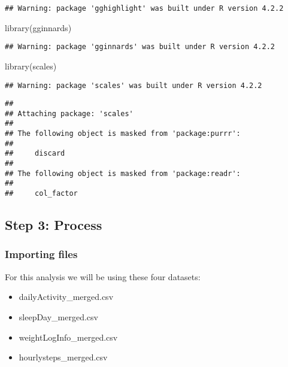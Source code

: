 \documentclass[
]{article}
\newenvironment{Shaded}{\begin{snugshade}}{\end{snugshade}}
\newcommand{\FunctionTok}[1]{\textcolor[rgb]{0.00,0.00,0.00}{#1}}
\newcommand{\NormalTok}[1]{#1}
\providecommand{\tightlist}{%
  \setlength{\itemsep}{0pt}\setlength{\parskip}{0pt}}
\begin{document}
\begin{verbatim}
## Warning: package 'gghighlight' was built under R version 4.2.2
\end{verbatim}

\begin{Shaded}
\begin{Highlighting}[]
  \FunctionTok{library}\NormalTok{(gginnards)}
\end{Highlighting}
\end{Shaded}

\begin{verbatim}
## Warning: package 'gginnards' was built under R version 4.2.2
\end{verbatim}

\begin{Shaded}
\begin{Highlighting}[]
  \FunctionTok{library}\NormalTok{(scales)}
\end{Highlighting}
\end{Shaded}

\begin{verbatim}
## Warning: package 'scales' was built under R version 4.2.2
\end{verbatim}

\begin{verbatim}
## 
## Attaching package: 'scales'
## 
## The following object is masked from 'package:purrr':
## 
##     discard
## 
## The following object is masked from 'package:readr':
## 
##     col_factor
\end{verbatim}

\hypertarget{step-3-process}{%
\subsection{Step 3: Process}\label{step-3-process}}

\hypertarget{importing-files}{%
\subsubsection{Importing files}\label{importing-files}}

For this analysis we will be using these four datasets:

\begin{itemize}
\tightlist
\item
  dailyActivity\_merged.csv
\item
  sleepDay\_merged.csv
\item
  weightLogInfo\_merged.csv
\item
  hourlysteps\_merged.csv
\end{itemize}
\end{document}
